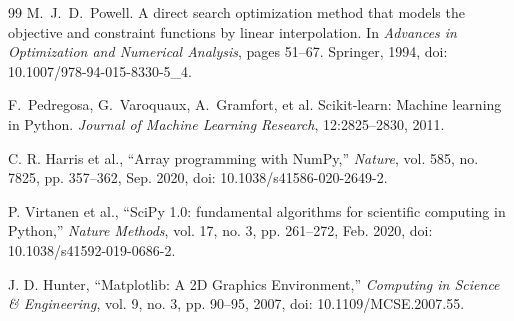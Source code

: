 \begin{thebibliography}{99}
M.~J.~D.~Powell. A direct search optimization method that models the objective and constraint functions by linear interpolation. In \emph{Advances in Optimization and Numerical Analysis}, pages 51--67. Springer, 1994, doi: 10.1007/978-94-015-8330-5\_4.

F.~Pedregosa, G.~Varoquaux, A.~Gramfort, et al. Scikit-learn: Machine learning in Python. \emph{Journal of Machine Learning Research}, 12:2825--2830, 2011.

C. R. Harris et al., ``Array programming with NumPy,'' \emph{Nature}, vol. 585, no. 7825, pp. 357--362, Sep. 2020, doi: 10.1038/s41586-020-2649-2.

P. Virtanen et al., ``SciPy 1.0: fundamental algorithms for scientific computing in Python,'' \emph{Nature Methods}, vol. 17, no. 3, pp. 261--272, Feb. 2020, doi: 10.1038/s41592-019-0686-2.

J. D. Hunter, ``Matplotlib: A 2D Graphics Environment,'' \emph{Computing in Science \& Engineering}, vol. 9, no. 3, pp. 90--95, 2007, doi: 10.1109/MCSE.2007.55.

\end{thebibliography}
